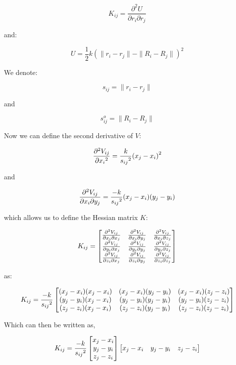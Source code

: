 \documentclass[
]{article}
\begin{document}
\[K_{ij} = \frac{\partial^2 U}{\partial r_{i} \partial r_{j}}\]

and:

\[U = \frac{1}{2} k(\|r_i - r_j\|-\|R_i-R_j\|)^2\]

We denote:

\[s_{ij} = \|r_i-r_j\|\]

and

\[s_{ij}^o = \|R_i-R_j\|\]

Now we can define the second derivative of \(V\):

\[{\partial^2 V_{ij}\over\partial{x_i}^2} = {k\over {s_{ij}}^2} {(x_j - x_i)}^2\]

and

\[{\partial^2 V_{ij}\over\partial x_i\partial y_j} = {-k\over {s_{ij}}^2} {(x_j
- x_i)}{(y_j-y_i)}\]

which allows us to define the Hessian matrix \(K\):

\[%
K_{ij} = \begin{bmatrix}  {\partial^2 V_{ij}\over\partial x_i\partial x_j} &
{\partial^2 V_{ij}\over\partial x_i\partial y_j} & {\partial^2
V_{ij}\over\partial x_i\partial z_j} \\ {\partial^2 V_{ij}\over\partial
y_i\partial x_j} & {\partial^2 V_{ij}\over\partial y_i\partial y_j} &
{\partial^2 V_{ij}\over\partial y_i\partial z_j} \\ {\partial^2
V_{ij}\over\partial z_i\partial x_j} & {\partial^2 V_{ij}\over\partial
z_i\partial y_j} & {\partial^2 V_{ij}\over\partial z_i\partial z_j}\end{bmatrix} %
\]

as:

\[%
K_{ij} = {-k\over {s_{ij}}^2} \begin{bmatrix} {(x_j - x_i)(x_j - x_i)} & {(x_j
- x_i)(y_j - y_i)} & {(x_j - x_i)(z_j - z_i)} \\ {(y_j - y_i)(x_j - x_i)} &
{(y_j - y_i)(y_j - y_i)} & {(y_j - y_i)(z_j - z_i)} \\{(z_j - z_i)(x_j - x_i)} &
{(z_j - z_i)(y_j - y_i)} & {(z_j - z_i)(z_j - z_i)} \end{bmatrix} %
\]

Which can then be written as,

\[%
K_{ij} = {-k\over {s_{ij}}^2} \begin{bmatrix} x_j - x_i\\y_j - y_i\\z_j-z_i
\end{bmatrix} \begin{bmatrix} x_j - x_i & y_j - y_i & z_j-z_i \end{bmatrix} %
\]
\end{document}
